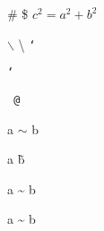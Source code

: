 \documentclass[a4paper]{ctexart}
\begin{document}
	\#
	\$
	$c^2 = a^2 + b^2$
	
	$\backslash$ \textbackslash
	\texttt{}
	\texttt{\char`\\}
	
	\texttt{\char`~}
	
	\texttt{\char~@}
	
	a $\sim$ b
	
	a \~ b
	
	a \~{} b
	
	a \textasciitilde{} b
	
\end{document}
